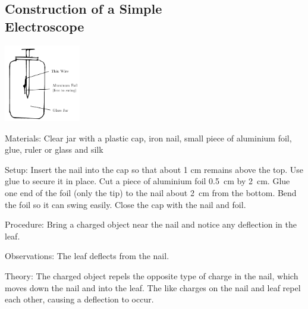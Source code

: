 \begin{multicols}{2}
\subsection[Construction of a Simple Electroscope]{Construction of a Simple \hfill \\ Electroscope}

\begin{center}
\includegraphics[width=0.25\textwidth]{./img/al-leaf-electroscope.png}
\end{center}

\begin{description*}
\item[Materials:]{Clear jar with a plastic cap, iron nail, small piece of aluminium foil, glue, ruler or glass and silk}
\item[Setup:]{Insert the nail into the cap so that about 1 cm remains above the top. Use glue to secure it in place. Cut a piece of aluminium foil 0.5~cm by 2~cm. Glue one end of the foil (only the tip) to the nail about 2~cm from the bottom. Bend the foil so it can swing easily. Close the cap with the nail and foil.}
\item[Procedure:]{Bring a charged object near the nail and notice any deflection in the leaf.}
\item[Observations:]{The leaf deflects from the nail.}
\item[Theory:]{The charged object repels the opposite type of charge in the nail, which moves down the nail and into the leaf. The like charges on the nail and leaf repel each other, causing a deflection to occur.}
\end{description*}



\end{multicols}

